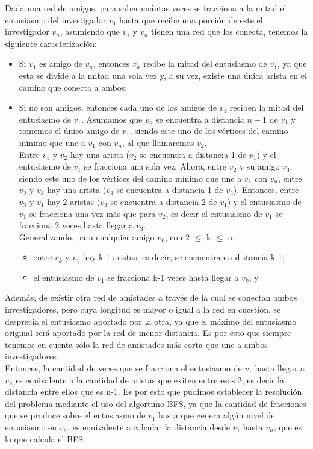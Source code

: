 \indent Dada una red de amigos, para saber cuántas veces se fracciona a la mitad
el entusiasmo del investigador $v_1$ hasta que recibe una porción de este el
investigador $v_n$, asumiendo que $v_1$ y $v_n$ tienen una red que los conecta,
tenemos la siguiente caracterización:
\begin{itemize}
 \item Si $v_1$ es amigo de $v_n$, entonces $v_n$ recibe la mitad del entusiasmo
de $v_1$, 
 ya que esta se divide a la mitad una sola vez y, a su vez, existe una única
arista en el camino que conecta a ambos.
 \item Si no son amigos, entonces cada uno de los amigos de $v_1$ reciben la
mitad del entusiasmo de $v_1$. Asumamos que $v_n$ se encuentra a distancia $n-1$
de $v_1$ y tomemos el único amigo de $v_1$, siendo este uno de los vértices del
camino mínimo que une a $v_1$ con $v_n$, al que llamaremos $v_2$. \\ 
\indent\indent Entre $v_1$ y $v_2$ hay una arista ($v_2$ se encuentra a
distancia 1 de $v_1$) y el entusiasmo de $v_1$ se fracciona una sola vez. Ahora,
entre $v_2$ y su amigo $v_3$, siendo este uno de los vértices del camino mínimo
que une a $v_1$ con $v_n$, entre $v_2$ y $v_3$ hay una arista ($v_3$ se
encuentra a distancia 1 de $v_2$). Entonces, entre $v_3$ y $v_1$ hay 2 aristas
($v_3$ se encuentra a distancia 2 de $v_1$) y el entusiasmo de $v_1$ se
fracciona una vez más que para $v_2$, es decir el entusiasmo de $v_1$ se
fracciona 2 veces hasta llegar a $v_3$. \\
\indent\indent Generalizando, para cualquier amigo $v_k$, con 2 $\leq$ k $\leq$
n:
 \begin{itemize}
  \item entre $v_k$ y $v_1$ hay k-1 aristas, es decir, se encuentran a distancia
k-1;
  \item el entusiasmo de $v_1$ se fracciona k-1 veces hasta llegar a $v_k$, y 
 \end{itemize}
\end{itemize}
\indent\indent Además, de existir otra red de amistades a través de la cual se
conectan ambos investigadores, pero cuya longitud es mayor o igual a la red en
cuestión, se desprecia el entusiasmo aportado por la otra, ya que el máximo del
entusiasmo original será aportado por la red de menor distancia. Es por esto que
siempre tenemos en cuenta sólo la red de amistades más corta
que une a ambos investigadores.\\

\indent Entonces, la cantidad de veces que se fracciona el entusiasmo de
$v_1$ hasta llegar a $v_n$ 
 es equivalente a la cantidad de aristas que exiten entre esos 2, es decir la
distancia entre ellos que es n-1.
 Es por esto que pudimos establecer la resolución del problema mediante
el uso del algortimo BFS, ya que la cantidad de fracciones que se produce sobre
el entusiasmo de $v_1$ hasta que genera algún nivel de entusiasmo en $v_n$, es
equivalente a calcular la distancia desde $v_1$ hasta $v_n$, que es lo que
calcula el BFS.\\

